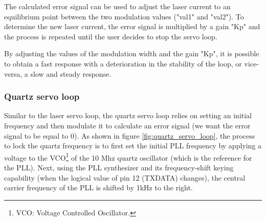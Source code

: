 \documentclass[a4paper,12pt]{article}
\newcounter{step}
\begin{document}

The calculated error signal can be used to adjust the laser current to an equilibrium point between the two modulation values ("val1" and "val2"). To determine the new laser current, the error signal is multiplied by a gain "Kp" and the process is repeated until the user decides to stop the servo loop. 

By adjusting the values of the modulation width and the gain "Kp", it is possible to obtain a fast response with a deterioration in the stability of the loop, or vice-versa, a slow and steady response.


\subsubsection{Quartz servo loop}




Similar to the laser servo loop, the quartz servo loop relies on setting an initial frequency and then modulate it to calculate an error signal (we want the error signal to be equal to 0). As shown in figure \ref{fig:quartz_servo_loop}, the process to lock the quartz frequency is to first set the initial PLL frequency by applying a voltage to the VCO\footnote{VCO: Voltage Controlled Oscillator.} of the 10 Mhz quartz oscillator (which is the reference for the PLL). Next, using the PLL synthesizer and its frequency-shift keying capability (when the logical value of pin 12 (TXDATA) changes), the central carrier frequency of the PLL is shifted by 1kHz to the right.
\end{document}
